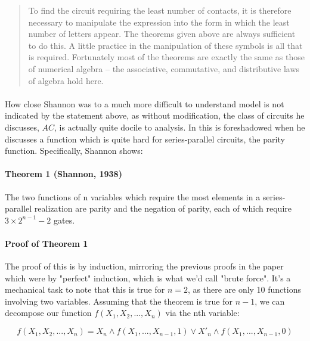 \documentclass{article}
\begin{document}
\begin{quote}

To find the circuit requiring the least number of contacts, it is therefore necessary to
manipulate the expression into the form in which the least number of letters appear. The
theorems given above are always sufficient to do this. A little practice in the manipulation
of these symbols is all that is required. Fortunately most of the theorems are exactly the
same as those of numerical algebra -- the associative, commutative, and distributive laws
of algebra hold here. \cite{Shannon1938}  

\end{quote}

\paragraph*{}
  How close Shannon was to a much more difficult to understand model is not indicated by
the statement above, as without modification, the class of circuits he discusses,
$AC$, is actually quite docile to analysis. In \cite{Shannon1938} this is foreshadowed
when he discusses a function which is quite hard for series-parallel circuits, the
parity function. Specifically, Shannon shows:

\paragraph*{Theorem 1 (Shannon, 1938)}
  The two functions of n variables which require the most elements in a series-parallel
realization are parity and the negation of parity, each of which require $3 \times 2^{n-1} - 2$
gates.

\paragraph*{Proof of Theorem 1 \cite{Shannon1938}}
  The proof of this is by induction, mirroring the previous proofs in the paper which were
by "perfect" induction, which is what we'd call "brute force". It's a mechanical task to note
that this is true for $n = 2$, as there are only 10 functions involving two variables. Assuming
that the theorem is true for $n - 1$, we can decompose our function $f(X_1, X_2, ..., X_n)$
via the nth variable:

\[ f(X_1, X_2, ..., X_n) = X_n \wedge f(X_1, ..., X_{n-1}, 1) \vee X'_n \wedge f(X_1, ..., X_{n-1}, 0)\]
\end{document}
